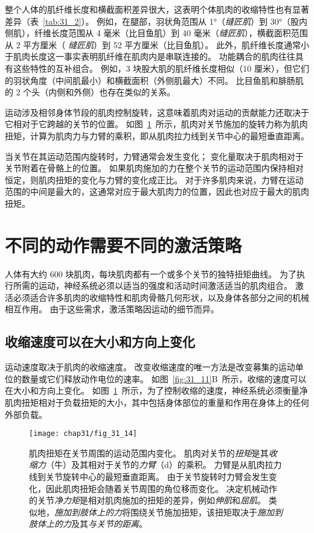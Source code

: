 整个人体的肌纤维长度和横截面积差异很大，这表明个体肌肉的收缩特性也有显著差异（表~\ref{tab:31_2}）。
例如，在腿部，羽状角范围从 1°（\textit{缝匠肌}）到 30°（股内侧肌），纤维长度范围从 4 毫米（比目鱼肌）到 40 毫米（\textit{缝匠肌}），横截面积范围从 2 平方厘米（ \textit{缝匠肌}）到 52 平方厘米（比目鱼肌）。
此外，肌纤维长度通常小于肌肉长度这一事实表明肌纤维在肌肉内是串联连接的。
功能耦合的肌肉往往具有这些特性的互补组合。
例如，3 块股大肌的肌纤维长度相似（10 厘米），但它们的羽状角度（中间肌最小）和横截面积（外侧肌最大）不同。
比目鱼肌和腓肠肌的 2 个头（内侧和外侧）也存在类似的关系。


运动涉及相邻身体节段的肌肉控制旋转，这意味着肌肉对运动的贡献能力还取决于它相对于它跨越的关节的位置。
如图~\ref{fig:31_14}~所示，肌肉对关节施加的旋转力称为肌肉扭矩，计算为肌肉力与力臂的乘积，即从肌肉拉力线到关节中心的最短垂直距离。


当关节在其运动范围内旋转时，力臂通常会发生变化；
变化量取决于肌肉相对于关节附着在骨骼上的位置。
如果肌肉施加的力在整个关节的运动范围内保持相对恒定，则肌肉扭矩的变化与力臂的变化成正比。
对于许多肌肉来说，力臂在运动范围的中间是最大的，这通常对应于最大肌肉力的位置，因此也对应于最大的肌肉扭矩。



\section{不同的动作需要不同的激活策略}

人体有大约 600 块肌肉，每块肌肉都有一个或多个关节的独特扭矩曲线。
为了执行所需的运动，神经系统必须以适当的强度和活动时间激活适当的肌肉组合。
激活必须适合许多肌肉的收缩特性和肌肉骨骼几何形状，以及身体各部分之间的机械相互作用。
由于这些需求，激活策略因运动的细节而异。



\subsection{收缩速度可以在大小和方向上变化}

运动速度取决于肌肉的收缩速度。
改变收缩速度的唯一方法是改变募集的运动单位的数量或它们释放动作电位的速率。
如图~\ref{fig:31_11}B~所示，收缩的速度可以在大小和方向上变化。
如图~\ref{fig:31_14}~所示，为了控制收缩的速度，神经系统必须衡量净肌肉扭矩相对于负载扭矩的大小，其中包括身体部位的重量和作用在身体上的任何外部负载。


\begin{figure}[htbp]
	\centering
	\texttt{[image: chap31/fig\_31\_14]}
	\caption{肌肉扭矩在关节周围的运动范围内变化。
	肌肉对关节的\textit{扭矩}是其\textit{收缩力}（牛）及其相对于关节的\textit{力臂}（d）的乘积。
	力臂是从肌肉拉力线到关节旋转中心的最短垂直距离。
	由于关节旋转时力臂会发生变化，因此肌肉扭矩会随着关节周围的角位移而变化。
	决定机械动作的关节\textit{净力矩}是相对肌肉施加的扭矩的差异，例如\textit{伸肌}和\textit{屈肌}。
	类似地，\textit{施加到肢体上的力}将围绕关节施加扭矩，该扭矩取决于\textit{施加到肢体上的力}及其\textit{与关节的距离}。}
	\label{fig:31_14}
\end{figure}


